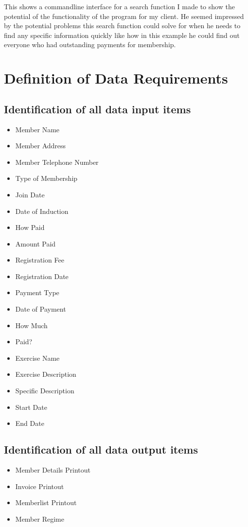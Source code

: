 This shows a commandline interface for a search function I made to show the potential of the functionality of the program for my client. He seemed impressed by the potential problems this search function could solve for when he needs to find any specific information quickly like how in this example he could find out everyone who had outstanding payments for membership.

\section{Definition of Data Requirements}

\subsection{Identification of all data input items}

\begin{itemize}
    \item Member Name
    \item Member Address
    \item Member Telephone Number
    \item Type of Membership
    \item Join Date
    \item Date of Induction
    \item How Paid
    \item Amount Paid
    \item Registration Fee
    \item Registration Date
    \item Payment Type
    \item Date of Payment
    \item How Much
    \item Paid?
    \item Exercise Name
    \item Exercise Description
    \item Specific Description
    \item Start Date
    \item End Date
\end{itemize}

\subsection{Identification of all data output items}

\begin{itemize}
    \item Member Details Printout
    \item Invoice Printout
    \item Memberlist Printout
    \item Member Regime
\end{itemize}

